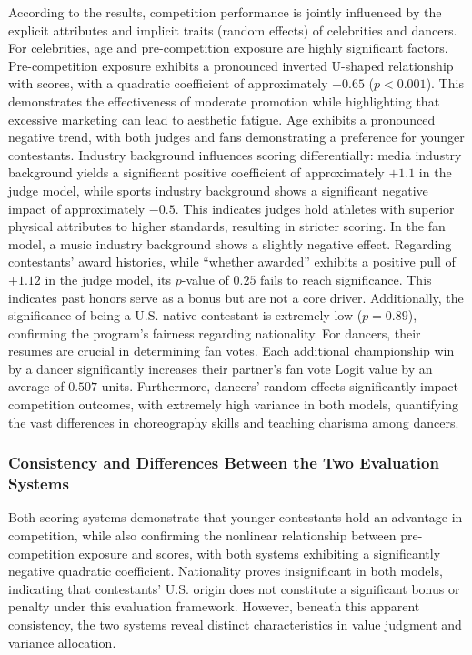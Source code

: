 \documentclass[12pt]{article}
\begin{document}
According to the results, competition performance is jointly influenced by the explicit attributes and implicit traits (random effects) of celebrities and dancers. For celebrities, age and pre-competition exposure are highly significant factors. Pre-competition exposure exhibits a pronounced inverted U-shaped relationship with scores, with a quadratic coefficient of approximately $-0.65$ ($p < 0.001$). This demonstrates the effectiveness of moderate promotion while highlighting that excessive marketing can lead to aesthetic fatigue. Age exhibits a pronounced negative trend, with both judges and fans demonstrating a preference for younger contestants. Industry background influences scoring differentially: media industry background yields a significant positive coefficient of approximately $+1.1$ in the judge model, while sports industry background shows a significant negative impact of approximately $-0.5$. This indicates judges hold athletes with superior physical attributes to higher standards, resulting in stricter scoring. In the fan model, a music industry background shows a slightly negative effect. Regarding contestants' award histories, while ``whether awarded'' exhibits a positive pull of $+1.12$ in the judge model, its $p$-value of $0.25$ fails to reach significance. This indicates past honors serve as a bonus but are not a core driver. Additionally, the significance of being a U.S. native contestant is extremely low ($p = 0.89$), confirming the program's fairness regarding nationality. For dancers, their resumes are crucial in determining fan votes. Each additional championship win by a dancer significantly increases their partner's fan vote Logit value by an average of $0.507$ units. Furthermore, dancers' random effects significantly impact competition outcomes, with extremely high variance in both models, quantifying the vast differences in choreography skills and teaching charisma among dancers.

\subsubsection{Consistency and Differences Between the Two Evaluation Systems}
Both scoring systems demonstrate that younger contestants hold an advantage in competition, while also confirming the nonlinear relationship between pre-competition exposure and scores, with both systems exhibiting a significantly negative quadratic coefficient. Nationality proves insignificant in both models, indicating that contestants' U.S. origin does not constitute a significant bonus or penalty under this evaluation framework. However, beneath this apparent consistency, the two systems reveal distinct characteristics in value judgment and variance allocation.
\end{document}

